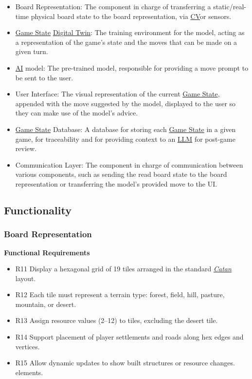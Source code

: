 \documentclass{article}
\newcommand{\Catan}{\href{https://en.wikipedia.org/wiki/Catan}{Catan}}
\newcommand{\AI}{\href{https://en.wikipedia.org/wiki/Artificial_intelligence}{AI}}
\newcommand{\DigitalTwin}{\href{https://en.wikipedia.org/wiki/Digital_twin}{Digital Twin}}
\newcommand{\CV}{\href{https://www.ibm.com/think/topics/computer-vision}{CV}}
\newcommand{\LLM}{\href{https://www.cloudflare.com/learning/ai/what-is-large-language-model/}{LLM}}
\newcommand{\GameState}{\href{https://milvus.io/ai-quick-reference/what-is-a-state-in-rl}{Game State}}
\begin{document}
\begin{itemize}
    \item Board Representation: The component
    in charge of transferring a static/real-time physical board state to the board
    representation, via \CV{}or sensors.

    \item \GameState{} \DigitalTwin{}: The training
    environment for the model, acting as a representation of the game's state and the
    moves that can be made on a given turn.

    \item \AI{} model: The pre-trained model,
    responsible for providing a move prompt to be sent to the user.

    \item User Interface: The visual
    representation of the current \GameState{}, appended with the move suggested by
    the model, displayed to the user so they can make use of the model's advice.

    \item \GameState{} Database: A database for
    storing each \GameState{} in a given game, for traceability and for providing
    context to an \LLM{} for post-game review.

    \item Communication Layer: The component
    in charge of communication between various components, such as sending the read
    board state to the board representation or transferring the model’s provided
    move to the UI\@.
\end{itemize}


\subsection{Functionality}\label{subsec:functionality}

\subsubsection{Board Representation}
\label{subsubsec:board-representation}

\textbf{Functional Requirements}

\begin{itemize}
  \item R11 Display a hexagonal grid of 19 tiles arranged in the standard 
  \emph{\Catan{}} layout.
  \item R12 Each tile must represent a terrain type: forest, field, hill, 
  pasture, mountain, or desert.
  \item R13 Assign resource values (2--12) to tiles, excluding the desert tile.
  \item R14 Support placement of player settlements and roads along hex edges
        and vertices.
  \item R15 Allow dynamic updates to show built structures or resource changes.
  elements.
\end{itemize}
\end{document}
